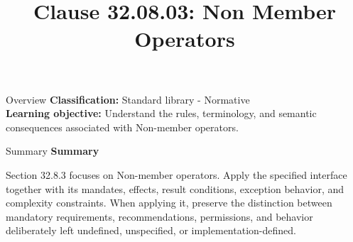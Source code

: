 \documentclass[10pt,letterpaper]{article}
\title{Clause 32.08.03: Non Member Operators}
\author{}
\date{}
\begin{document}
\maketitle
\begin{CornellOverviewBox}{Overview}
\textbf{Classification:} Standard library - Normative\\[2pt]
\textbf{Learning objective:} Understand the rules, terminology, and semantic consequences associated with Non-member operators.
\end{CornellOverviewBox}\begin{CornellSummaryBox}{Summary}
{\sffamily\bfseries\color{Accent} Summary}\par\vspace{3pt}Section 32.8.3 focuses on Non-member operators. Apply the specified interface together with its mandates, effects, result conditions, exception behavior, and complexity constraints. When applying it, preserve the distinction between mandatory requirements, recommendations, permissions, and behavior deliberately left undefined, unspecified, or implementation-defined.
\end{CornellSummaryBox}
\end{document}
